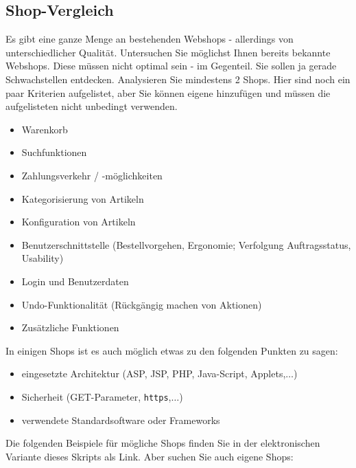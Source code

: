 \subsection{Shop-Vergleich}
\label{subsec:shop-vergleich}

Es gibt eine ganze Menge an bestehenden Webshops - allerdings von unterschiedlicher Qualität.
Untersuchen Sie möglichst Ihnen bereits bekannte Webshops. Diese müssen nicht optimal sein -
im Gegenteil. Sie sollen ja gerade Schwachstellen entdecken. Analysieren Sie mindestens 2 Shops.
Hier sind noch ein paar Kriterien aufgelistet, aber Sie können eigene hinzufügen und müssen
die aufgelisteten nicht unbedingt verwenden.

\begin{multicols}{2}
    \begin{itemize}
        \item Warenkorb
        \item Suchfunktionen
        \item Zahlungsverkehr / -möglichkeiten
        \item Kategorisierung von Artikeln
        \item Konfiguration von Artikeln
        \item Benutzerschnittstelle (Bestellvorgehen, Ergonomie; Verfolgung Auftragsstatus, Usability)
        \item Login und Benutzerdaten
        \item Undo-Funktionalität (Rückgängig machen von Aktionen)
        \item Zusätzliche Funktionen
    \end{itemize}
\end{multicols}

In einigen Shops ist es auch möglich etwas zu den folgenden Punkten zu sagen:

\begin{itemize}
    \item eingesetzte Architektur (ASP, JSP, PHP, Java-Script, Applets,$\ldots$)
    \item Sicherheit (GET-Parameter, \texttt{https},$\ldots$)
    \item verwendete Standardsoftware oder Frameworks
\end{itemize}

Die folgenden Beispiele für mögliche Shops finden Sie in der elektronischen Variante
dieses Skripts als Link. Aber suchen Sie auch eigene Shops:

